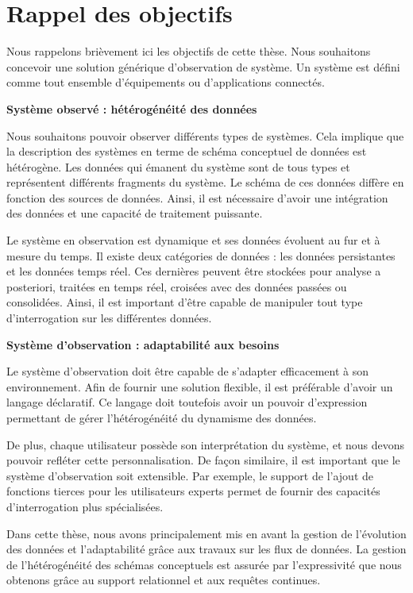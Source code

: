 \section{Rappel des objectifs}\label{sec:conclusion:objectifs}
Nous rappelons brièvement ici les objectifs de cette thèse. Nous souhaitons concevoir une solution générique d'observation de système. Un système est défini comme tout ensemble d'équipements ou d'applications connectés. 

\vspace{1ex}\noindent\textbf{Système observé : hétérogénéité des données}

\vspace{1ex}
Nous souhaitons pouvoir observer différents types de systèmes. Cela implique que la description des systèmes en terme de schéma conceptuel de données est hétérogène. Les données qui émanent du système sont de tous types et représentent différents fragments du système. Le schéma de ces données diffère en fonction des sources de données. Ainsi, il est nécessaire d'avoir une intégration des données et une capacité de traitement puissante.

Le système en observation est dynamique et ses données évoluent au fur et à mesure du temps. Il existe deux catégories de données : les données persistantes et les données temps réel. Ces dernières peuvent être stockées pour analyse a posteriori, traitées en temps réel, croisées avec des données passées ou consolidées. Ainsi, il est important d'être capable de manipuler tout type d'interrogation sur les différentes données.

\vspace{1ex}\noindent\textbf{Système d'observation : adaptabilité aux besoins}

\vspace{1ex}
Le système d'observation doit être capable de s'adapter efficacement à son environnement. Afin de fournir une solution flexible, il est préférable d'avoir un langage déclaratif. Ce langage doit toutefois avoir un pouvoir d'expression permettant de gérer l'hétérogénéité du dynamisme des données.

De plus, chaque utilisateur possède son interprétation du système, et nous devons pouvoir refléter cette personnalisation. De façon similaire, il est important que le système d'observation soit extensible. Par exemple, le support de l'ajout de fonctions tierces pour les utilisateurs experts permet de fournir des capacités d'interrogation plus spécialisées.

Dans cette thèse, nous avons principalement mis en avant la gestion de l'évolution des données et l'adaptabilité grâce aux travaux sur les flux de données. La gestion de l'hétérogénéité des schémas conceptuels est assurée par l'expressivité que nous obtenons grâce au support relationnel et aux requêtes continues.

